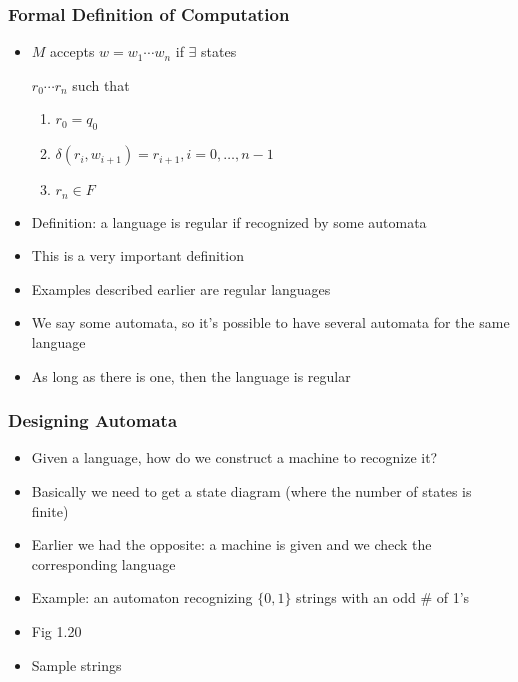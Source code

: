 \begin{frame}[allowframebreaks] \frametitle{Formal Definition of Computation}
  \begin{itemize}
\item $M$ accepts $w=w_1 \cdots w_n$ if $\exists$ states

 $r_0 \cdots r_n$ such that
  \begin{enumerate}
  \item $r_0 = q_0$
  \item $\delta(r_i, w_{i+1})= r_{i+1}, i = 0, \ldots, n-1$
  \item $r_n \in F$
  \end{enumerate}
\item \alert{Definition}:
  a language is regular if recognized by some automata
\item This is a very important definition
\item Examples described earlier are regular languages
\item We say \alert{some} automata, so it's possible to have
  several automata for the same language
\item As long as there is one, then the language is regular
\end{itemize}\end{frame} \begin{frame}[allowframebreaks] \frametitle{Designing Automata}
  \begin{itemize}
\item Given a language, how do we construct a machine to recognize it?
\item Basically we need to get a state diagram (where the number
  of states is finite)
\item Earlier we had the opposite: a machine is given and we check the
  corresponding language
\item Example: an automaton recognizing $\{0,1\}$ strings with an odd
\# of 1's 

\item []Fig 1.20

\begin{center}
    \end{center}
\item Sample strings


\end{itemize}
\end{frame}
